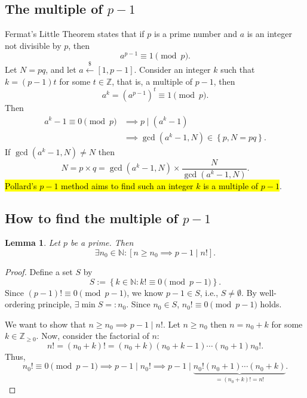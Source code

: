 \documentclass[12pt,openany]{book}
\DeclarePairedDelimiter{\ceil}{\lceil}{\rceil}
\newtheorem{lemma}[theorem]{Lemma}
\theoremstyle{definition}
\newtheorem{remark}{Remark}[chapter]
\newcommand{\set}[1]{\left\{#1\right\}}
\newcommand{\N}{\mathbb{N}}
\newcommand{\Z}{\mathbb{Z}}
\newcommand{\ie}{\textnormal{i.e.}}
\newcommand{\of}[1]{\left( #1 \right)}
\newcommand{\dollar}{\$}
\newcommand{\uniform}{\xleftarrow{\dollar}}
\begin{document}
	\subsection{The multiple of $p-1$}
	Fermat's Little Theorem states that if $p$ is a prime number and $a$ is an integer not divisible by $p$, then
	\[
	a^{p-1} \equiv 1 \pmod{p}.
	\]
	Let $N = pq$, and let $a\uniform[1,p-1]$. Consider an integer $k$ such that $k=(p-1)t$ for some $t\in\Z$, that is, a multiple of $p-1$, then
	\[
	a^k =\of{a^{p-1}}^t\equiv 1 \pmod{p}.
	\]
	Then \begin{align*}
		a^k - 1 \equiv 0 \pmod{p}&\implies p \mid (a^k - 1)\\
		&\implies \gcd\of{a^k-1, N}\in\set{p,N=pq}.
	\end{align*} If $\gcd\of{a^k-1,N}\neq N$ then \[
	N=p\times q=\gcd\of{a^k-1,N}\times\frac{N}{\gcd\of{a^k-1,N}}.
	\]
	\hl{Pollard's $p-1$ method aims to find such an integer $k$ is a multiple of $p-1$}.
	\vspace{8pt}
	\iffalse
	\begin{remark}
		Consider $\square\uniform\of{0,\ceil*{\sqrt{N}}}$. Then either $1<\gcd\of{\square,N}<N$ or $\gcd\of{\square,N}=1$.
		\begin{itemize}
			\item[] ($\gcd\of{\square,N}\in(1,N)$) Clearly, $N=\gcd\of{\square, N}\times\frac{N}{\gcd\of{\square, N}}$.
			\item[] ($\gcd\of{\square,N}=1$) Since $\left[\gcd\of{\square,N}=1\Rightarrow\gcd\of{\square^k,N}=1\right]$,
		\end{itemize}
	\end{remark}
	\fi
	\subsection{How to find the multiple of $p-1$}
	
	\begin{tcolorbox}[colback=white,colframe=lemcolor,arc=5pt,title={\color{white}\bf Existence of the Multiple of $p-1$}]
		\begin{lemma}
			Let $p$ be a prime. Then \[
			\exists n_0\in\N:\left[n\geq n_0\implies p-1\mid n!\right].
			\]
		\end{lemma}
	\end{tcolorbox}
	\begin{proof}
		Define a set $S$ by \[
		S:=\set{k\in\N:k!\equiv0\pmod{p-1}}.
		\] Since $\of{p-1}!\equiv 0\pmod{p-1}$, we know $p-1\in S$, \ie, $S\neq\emptyset$. By well-ordering principle, $\exists\min S=:n_0$. Since $n_0\in S$, $n_0!\equiv 0\pmod{p-1}$ holds.
		
		We want to show that $n\geq n_0\implies p-1\mid n!$. Let $n\geq n_0$ then $n=n_0+k$ for some $k\in\Z_{\geq 0}$. Now, consider the factorial of $n$: \[
		n!=\of{n_0+k}!=\of{n_0+k}\of{n_0+k-1}\cdots\of{n_0+1}n_0!.
		\] Thus, \[
		n_0!\equiv 0\pmod{p-1}\implies p-1\mid n_0!\implies p-1\mid \underbrace{n_0!\of{n_0+1}\cdots\of{n_0+k}}_{=\of{n_0+k}!=n!}.
		\]
	\end{proof}
	
\end{document}
